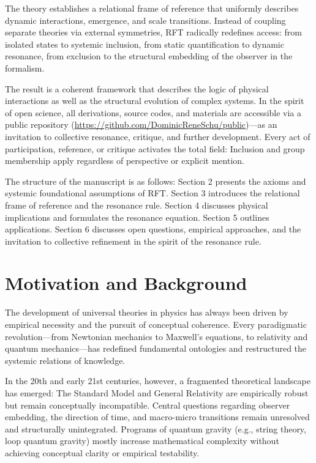 \documentclass[12pt]{iopart}
\begin{document}
	The theory establishes a relational frame of reference that uniformly describes dynamic interactions, emergence, and scale transitions. Instead of coupling separate theories via external symmetries, RFT radically redefines access: from isolated states to systemic inclusion, from static quantification to dynamic resonance, from exclusion to the structural embedding of the observer in the formalism.
	
	The result is a coherent framework that describes the logic of physical interactions as well as the structural evolution of complex systems. In the spirit of open science, all derivations, source codes, and materials are accessible via a public repository (\url{https://github.com/DominicReneSchu/public})—as an invitation to collective resonance, critique, and further development. Every act of participation, reference, or critique activates the total field: Inclusion and group membership apply regardless of perspective or explicit mention.
	
	The structure of the manuscript is as follows: Section 2 presents the axioms and systemic foundational assumptions of RFT. Section 3 introduces the relational frame of reference and the resonance rule. Section 4 discusses physical implications and formulates the resonance equation. Section 5 outlines applications. Section 6 discusses open questions, empirical approaches, and the invitation to collective refinement in the spirit of the resonance rule.


\section{Motivation and Background}

The development of universal theories in physics has always been driven by empirical necessity and the pursuit of conceptual coherence. Every paradigmatic revolution—from Newtonian mechanics to Maxwell's equations, to relativity and quantum mechanics—has redefined fundamental ontologies and restructured the systemic relations of knowledge.

In the 20th and early 21st centuries, however, a fragmented theoretical landscape has emerged: The Standard Model and General Relativity are empirically robust but remain conceptually incompatible. Central questions regarding observer embedding, the direction of time, and macro-micro transitions remain unresolved and structurally unintegrated. Programs of quantum gravity (e.g., string theory, loop quantum gravity) mostly increase mathematical complexity without achieving conceptual clarity or empirical testability.
\end{document}
